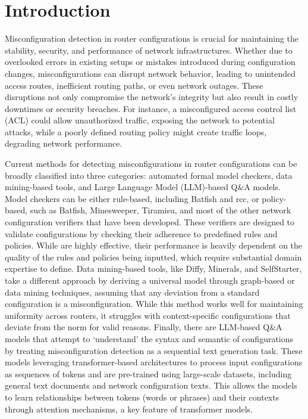 
\section{Introduction}
\label{sec:intro}

Misconfiguration detection in router configurations is crucial for maintaining the stability, security, and performance of network infrastructures. Whether due to overlooked errors in existing setups or mistakes introduced during configuration changes, misconfigurations can disrupt network behavior, leading to unintended access routes, inefficient routing paths, or even network outages. These disruptions not only compromise the network’s integrity but also result in costly downtimes or security breaches. For instance, a misconfigured access control list (ACL) could allow unauthorized traffic, exposing the network to potential attacks, while a poorly defined routing policy might create traffic loops, degrading network performance.

Current methods for detecting misconfigurations in router configurations can be broadly classified into three categories: automated formal model checkers, data mining-based tools, and Large Language Model (LLM)-based Q\&A models. Model checkers can be either rule-based, including Batfish and rcc, or policy-based, such as Batfish, Minesweeper, Tiramisu, and most of the other network configuration verifiers that have been developed. These verifiers are designed to validate configurations by checking their adherence to predefined rules and policies. While are highly effective, their performance is heavily dependent on the quality of the rules and policies being inputted, which require substantial domain expertise to define. Data mining-based tools, like Diffy, Minerals, and SelfStarter, take a different approach by deriving a universal model through graph-based or data mining techniques, assuming that any deviation from a standard configuration is a misconfiguration. While this method works well for maintaining uniformity across routers, it struggles with context-specific configurations that deviate from the norm for valid reasons. Finally, there are LLM-based Q\&A models that attempt to `understand' the syntax and semantic of configurations by treating misconfiguration detection as a sequential text generation task. These models leveraging transformer-based architectures to process input configurations as sequences of tokens and are pre-trained using large-scale datasets, including general text documents and network configuration texts. This allows the models to learn relationships between tokens (words or phrases) and their contexts through attention mechanisms, a key feature of transformer models.

